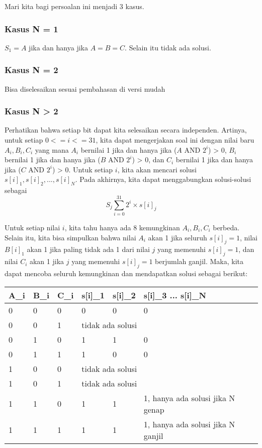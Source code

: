 \documentclass[../editorial_template.tex]{subfiles} %
\begin{document}
Mari kita bagi persoalan ini menjadi 3 kasus.
\subsubsection{Kasus N = 1}

$S_1 = A$ jika dan hanya jika $A = B = C$. Selain itu tidak ada solusi.

\subsubsection{Kasus N = 2}

Bisa diselesaikan sesuai pembahasan di versi mudah

\subsubsection{Kasus N > 2}

Perhatikan bahwa setiap bit dapat kita selesaikan secara independen. Artinya, untuk setiap $0 <= i <= 31$, kita dapat mengerjakan soal ini dengan nilai baru $A_i, B_i, C_i$ yang mana $A_i$ bernilai 1 jika dan hanya jika ($A$ AND $2^i$) > 0, $B_i$ bernilai 1 jika dan hanya jika ($B$ AND $2^i$) > 0, dan $C_i$ bernilai 1 jika dan hanya jika ($C$ AND $2^i$) > 0. Untuk setiap $i$, kita akan mencari solusi $s[i]_1, s[i]_2, ..., s[i]_N$. Pada akhirnya, kita dapat menggabungkan solusi-solusi sebagai $$S_j \sum_{i=0}^{31} 2^i \times s[i]_j$$

Untuk setiap nilai $i$, kita tahu hanya ada 8 kemungkinan $A_i, B_i, C_i$ berbeda. Selain itu, kita bisa simpulkan bahwa nilai $A_i$ akan 1 jika seluruh $s[i]_j = 1$, nilai $B[i]_1$ akan 1 jika paling tidak ada 1 dari nilai $j$ yang memenuhi $s[i]_j = 1$, dan nilai $C_i$ akan 1 jika $j$ yang memenuhi $s[i]_j = 1$ berjumlah ganjil. Maka, kita dapat mencoba seluruh kemungkinan dan mendapatkan solusi sebagai berikut:

\begin{table}[]
\centering
\begin{tabular}{@{}llllll@{}}
\hline
A\_i & B\_i & C\_i & s{[}i{]}\_1 & s{[}i{]}\_2 & s{[}i{]}\_3 ... s{[}i{]}\_N       \\ \hline
0    & 0    & 0    & 0           & 0           & 0                                 \\
0    & 0    & 1    & \multicolumn{3}{l}{tidak ada solusi}                          \\
0    & 1    & 0    & 1           & 1           & 0                                 \\
0    & 1    & 1    & 1           & 0           & 0                                 \\
1    & 0    & 0    & \multicolumn{3}{l}{tidak ada solusi}                          \\
1    & 0    & 1    & \multicolumn{3}{l}{tidak ada solusi}                          \\
1    & 1    & 0    & 1           & 1           & 1, hanya ada solusi jika N genap  \\
1    & 1    & 1    & 1           & 1           & 1, hanya ada solusi jika N ganjil \\ \hline
\end{tabular}
\end{table}
\end{document}
